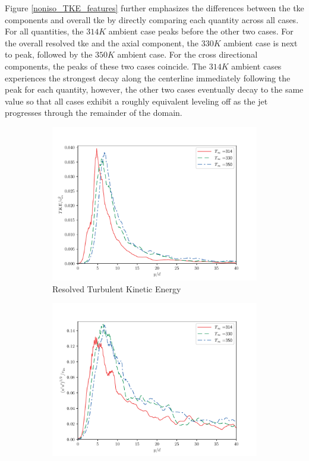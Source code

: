 Figure \ref{noniso_TKE_features} further emphasizes the differences between the \gls{tke} components and overall \gls{tke} by directly comparing each quantity across all cases. For all quantities, the $314 K$ ambient case peaks before the other two cases. For the overall resolved \gls{tke} and the axial component, the $330 K$ ambient case is next to peak, followed by the $350 K$ ambient case. For the cross directional components, the peaks of these two cases coincide. The $314 K$ ambient cases experiences the strongest decay along the centerline immediately following the peak for each quantity, however, the other two cases eventually decay to the same value so that all cases exhibit a roughly equivalent leveling off as the jet progresses through the remainder of the domain. 

\begin{figure}[H]
\begin{center}
\begin{subfigure}{0.45\textwidth}
	\includegraphics[scale=.45]{figures/Plots/centerline/TKE_centerline.pdf}
	\caption{Resolved Turbulent Kinetic Energy} \label{TKE_centerline_1}
\end{subfigure}
\begin{subfigure}{0.45\textwidth}
	\includegraphics[scale=.45]{figures/Plots/centerline/u_fa_centerline.pdf}

\end{subfigure}
\end{center}
\end{figure}
